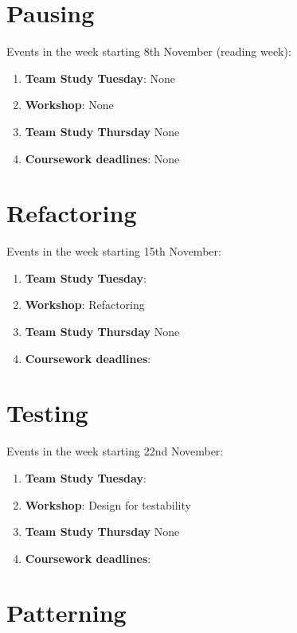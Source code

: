 \documentclass[
]{book}
\providecommand{\tightlist}{%
  \setlength{\itemsep}{0pt}\setlength{\parskip}{0pt}}
\begin{document}
\hypertarget{week7}{%
\section{Pausing}\label{week7}}

Events in the week starting 8th November (reading week):

\begin{enumerate}
\def\labelenumi{\arabic{enumi}.}
\tightlist
\item
  \textbf{Team Study Tuesday}: None
\item
  \textbf{Workshop}: None
\item
  \textbf{Team Study Thursday} None
\item
  \textbf{Coursework deadlines}: None
\end{enumerate}

\hypertarget{week8}{%
\section{Refactoring}\label{week8}}

Events in the week starting 15th November:

\begin{enumerate}
\def\labelenumi{\arabic{enumi}.}
\tightlist
\item
  \textbf{Team Study Tuesday}:
\item
  \textbf{Workshop}: Refactoring
\item
  \textbf{Team Study Thursday} None
\item
  \textbf{Coursework deadlines}:
\end{enumerate}

\hypertarget{week9}{%
\section{Testing}\label{week9}}

Events in the week starting 22nd November:

\begin{enumerate}
\def\labelenumi{\arabic{enumi}.}
\tightlist
\item
  \textbf{Team Study Tuesday}:
\item
  \textbf{Workshop}: Design for testability
\item
  \textbf{Team Study Thursday} None
\item
  \textbf{Coursework deadlines}:
\end{enumerate}

\hypertarget{week10}{%
\section{Patterning}\label{week10}}
\end{document}
